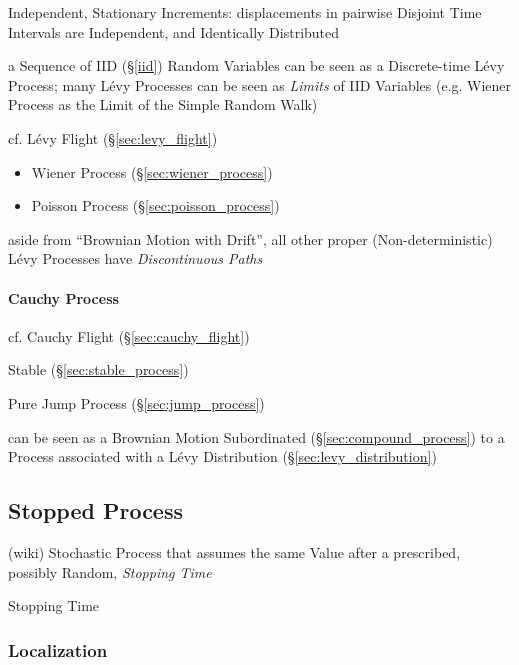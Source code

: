 Independent, Stationary Increments: displacements in pairwise Disjoint Time
Intervals are Independent, and Identically Distributed

\fist a Sequence of IID (\S\ref{iid}) Random Variables can be seen as a
Discrete-time L\'evy Process; many L\'evy Processes can be seen as \emph{Limits}
of IID Variables (e.g. Wiener Process as the Limit of the Simple Random Walk)

\fist cf. L\'evy Flight (\S\ref{sec:levy_flight})

\begin{itemize}
  \item Wiener Process (\S\ref{sec:wiener_process})
  \item Poisson Process (\S\ref{sec:poisson_process})
\end{itemize}

aside from ``Brownian Motion with Drift'', all other proper (Non-deterministic)
L\'evy Processes have \emph{Discontinuous Paths}



\paragraph{Cauchy Process}\label{sec:cauchy_process}\hfill

\fist cf. Cauchy Flight (\S\ref{sec:cauchy_flight})

Stable (\S\ref{sec:stable_process})

Pure Jump Process (\S\ref{sec:jump_process})

can be seen as a Brownian Motion Subordinated (\S\ref{sec:compound_process}) to
a Process associated with a L\'evy Distribution (\S\ref{sec:levy_distribution})



\subsection{Stopped Process}\label{sec:stopped_process}

(wiki) Stochastic Process that assumes the same Value after a prescribed,
possibly Random, \emph{Stopping Time}

Stopping Time



\subsubsection{Localization}\label{sec:localization}

